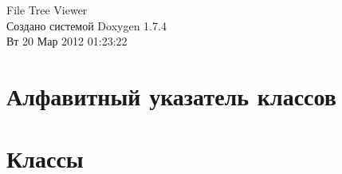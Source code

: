 \documentclass[a4paper]{book}
\begin{document}
\hypersetup{pageanchor=false}
\begin{titlepage}
\vspace*{7cm}
\begin{center}
{\Large File Tree Viewer }\\
\vspace*{1cm}
{\large Создано системой Doxygen 1.7.4}\\
\vspace*{0.5cm}
{\small Вт 20 Мар 2012 01:23:22}\\
\end{center}
\end{titlepage}
\clearemptydoublepage
{}
\tableofcontents
\clearemptydoublepage
{}
\hypersetup{pageanchor=true}
\chapter{Алфавитный указатель классов}

\chapter{Классы}







\printindex
\end{document}

